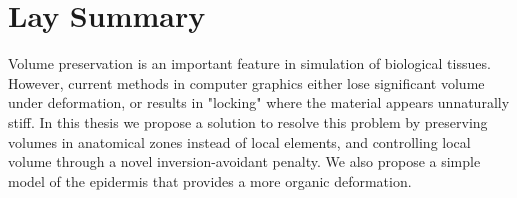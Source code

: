 

\chapter{Lay Summary}

Volume preservation is an important feature in simulation of biological tissues.
However, current methods in computer graphics either lose significant volume under deformation, or results in "locking" where the material appears unnaturally stiff.
In this thesis we propose a solution to resolve this problem by preserving volumes in anatomical zones instead of local elements, and controlling local volume through a novel inversion-avoidant penalty.
We also propose a simple model of the epidermis that provides a more organic deformation.
